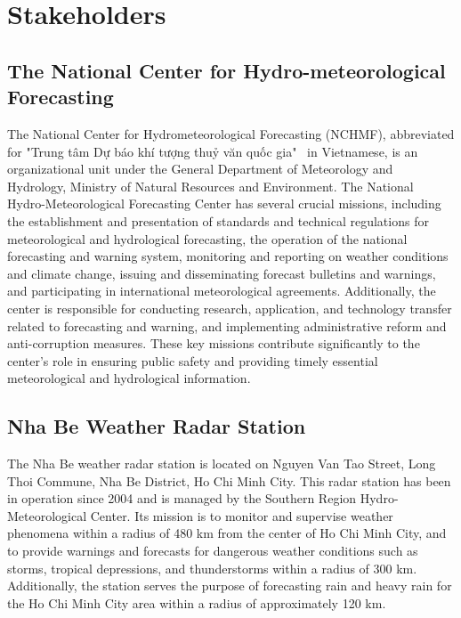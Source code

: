 \section{Stakeholders}

\subsection{The National Center for Hydro-meteorological Forecasting}

The National Center for Hydrometeorological Forecasting (NCHMF), abbreviated for
"Trung tâm Dự báo khí tượng thuỷ văn quốc gia" \ in Vietnamese, is an
organizational unit under the General Department of Meteorology and Hydrology,
Ministry of Natural Resources and Environment\cite{NMHS}. The National
Hydro-Meteorological Forecasting Center has several crucial missions, including
the establishment and presentation of standards and technical regulations for
meteorological and hydrological forecasting, the operation of the national
forecasting and warning system, monitoring and reporting on weather conditions
and climate change, issuing and disseminating forecast bulletins and warnings,
and participating in international meteorological agreements. Additionally, the
center is responsible for conducting research, application, and technology
transfer related to forecasting and warning, and implementing administrative
reform and anti-corruption measures. These key missions contribute significantly
to the center's role in ensuring public safety and providing timely essential
meteorological and hydrological information.

\subsection{Nha Be Weather Radar Station}

The Nha Be weather radar station is located on Nguyen Van Tao Street, Long Thoi
Commune, Nha Be District, Ho Chi Minh City. This radar station has been in
operation since 2004 and is managed by the Southern Region Hydro-Meteorological
Center. Its mission is to monitor and supervise weather phenomena within a
radius of 480 km from the center of Ho Chi Minh City, and to provide warnings
and forecasts for dangerous weather conditions such as storms, tropical
depressions, and thunderstorms within a radius of 300 km. Additionally, the
station serves the purpose of forecasting rain and heavy rain for the Ho Chi
Minh City area within a radius of approximately 120 km.

